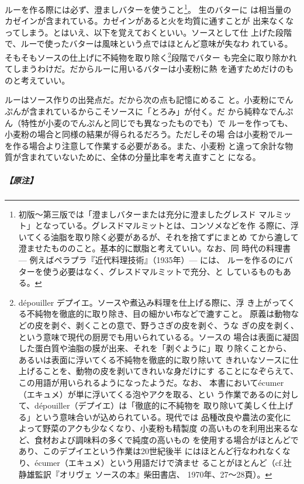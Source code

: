 \begin{recette}
ルーを作る際には必ず、澄ましバターを使うこと\footnote{初版〜第三版では「澄ましバターまたは充分に澄ましたグレスド
  マルミット」となっている。グレスドマルミットとは、コンソメなどを作
  る際に、浮いてくる油脂を取り除く必要があるが、それを捨てずにまとめ
  てから漉して澄ませたもののこと。基本的に獣脂と考えていい。なお、同
  時代の料理書 --- 例えばペラプラ『近代料理技術』（1935年）--- には、
  ルーを作るのにバターを使う必要はなく、グレスドマルミットで充分、と
  しているものもある。}。 生のバターに
は相当量のカゼインが含まれている。カゼインがあると火を均質に通すことが
出来なくなってしまう。とはいえ、以下を覚えておくといい。ソースとして仕
上げた段階で、ルーで使ったバターは風味という点ではほとんど意味が失なわ
れている。そもそもソースの仕上げに不純物を取り除く\footnote{dépouiller
  デプイエ。ソースや煮込み料理を仕上げる際に、浮
  き上がってくる不純物を徹底的に取り除き、目の細かい布などで漉すこと。
  原義は動物などの皮を剥ぐ、剥くことの意で、野うさぎの皮を剥ぐ、うな
  ぎの皮を剥く、という意味で現代の厨房でも用いられているる。ソースの
  場合は表面に凝固した蛋白質や油脂の膜が出来、それを「剥ぐように」取
  り除くことから、あるいは表面に浮いてくる不純物を徹底的に取り除いて
  きれいなソースに仕上げることを、動物の皮を剥いてきれいな身だけにす
  ることになぞらえて、この用語が用いられるようになったようだ。なお、
  本書においてécumer（エキュメ）が単に浮いてくる泡やアクを取る、とい
  う作業であるのに対して、dépouiller（デプイエ）は「徹底的に不純物を
  取り除いて美しく仕上げる」という意味合いが込められている。現代では
  品種改良や農法の変化によって野菜のアクも少なくなり、小麦粉も精製度
  の高いものを利用出来るなど、食材および調味料の多くで純度の高いもの
  を使用する場合がほとんどであり、このデプイエという作業は20世紀後半
  にはほとんど行なわれなくなり、écumer（エキュメ）という用語だけで済ませ
  ることがほとんど（cf.辻静雄監訳『オリヴェ ソースの本』柴田書店、
  1970年、27〜28頁）。}段階でバター
も完全に取り除かれてしまうわけだ。だからルーに用いるバターは小麦粉に熱
を通すためだけのものと考えていい。

ルーはソース作りの出発点だ。だから次の点も記憶にめるこ
と。小麦粉にでんぷんが含まれているからこそソースに「とろみ」が付く。だ
から純粋なでんぷん（特性が小麦のでんぷんと同じでも異なったものでも）で
ルーを作っても、小麦粉の場合と同様の結果が得られるだろう。ただしその場
合は小麦粉でルーを作る場合より注意して作業する必要がある。また、小麦粉
と違って余計な物質が含まれていないために、全体の分量比率を考え直すこと
になる。

\hypertarget{nota-roux}{%
\subparagraph{【原注】}\label{nota-roux}}


\end{recette}
